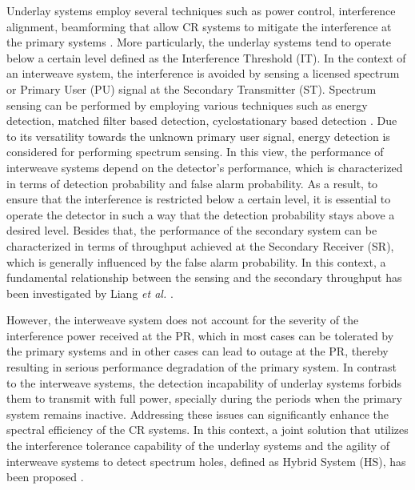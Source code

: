 Underlay systems employ several techniques such as power control, interference alignment, beamforming that allow CR systems to mitigate the interference at the primary systems \cite{Sharma15}. More particularly, the underlay systems tend to operate below a certain level defined as the Interference Threshold (IT). 
In the context of an interweave system, the interference is avoided by sensing a licensed spectrum or Primary User (PU) signal at the Secondary Transmitter (ST).
Spectrum sensing can be performed by employing various techniques such as energy detection, matched filter based detection, cyclostationary based detection \cite{Sharma15}. Due to its versatility towards the unknown primary user signal, energy detection is considered for performing spectrum sensing. In this view, the performance of interweave systems depend on the detector's performance, which is characterized in terms of detection probability and false alarm probability. 
As a result, to ensure that the interference is restricted below a certain level, it is essential to operate the detector in such a way that the detection probability stays above a desired level. Besides that, the performance of the secondary system can be characterized in terms of throughput achieved at the Secondary Receiver (SR), which is generally influenced by the false alarm probability. In this context, a fundamental relationship between the sensing and the secondary throughput has been investigated by Liang \textit{et al.} \cite{Liang08}. 

However, the interweave system does not account for the severity of the interference power received at the PR, which in most cases can be tolerated by the primary systems and in other cases can lead to outage at the PR, thereby resulting in serious performance degradation of the primary system. In contrast to the interweave systems, the detection incapability of underlay systems forbids them to transmit with full power, specially during the periods when the primary system remains inactive. Addressing these issues can significantly enhance the spectral efficiency of the CR systems. In this context, a joint solution that utilizes the interference tolerance capability of the underlay systems and the agility of interweave systems to detect spectrum holes, defined as Hybrid System (HS), has been proposed \cite{Kang09, Oh10, Senthu12, Jiang13, Sharma14}. 

